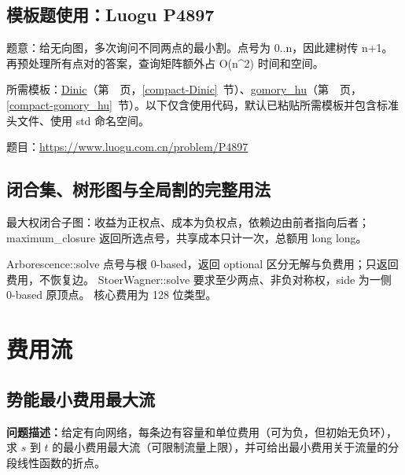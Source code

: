 

\Needspace{581pt}

\subsection*{模板题使用：Luogu P4897}

\label{usage-example-56}

题意：给无向图，多次询问不同两点的最小割。点号为 0..n，因此建树传 n+1。再预处理所有点对的答案，查询矩阵额外占 O(n\textasciicircum{}2) 时间和空间。

所需模板：\hyperref[compact-Dinic]{Dinic}（第~\pageref{compact-Dinic}~页，\ref{compact-Dinic}~节）、\hyperref[compact-gomory_hu]{gomory\_\allowbreak{}hu}（第~\pageref{compact-gomory_hu}~页，\ref{compact-gomory_hu}~节）。以下仅含使用代码，默认已粘贴所需模板并包含标准头文件、使用 std 命名空间。

题目：\url{https://www.luogu.com.cn/problem/P4897}



\subsection{闭合集、树形图与全局割的完整用法}\label{knowledge-closure-cuts}
最大权闭合子图：收益为正权点、成本为负权点，依赖边由前者指向后者；
maximum\_closure 返回所选点号，共享成本只计一次，总额用 long long。

Arborescence::solve 点号与根 0-based，返回 optional 区分无解与负费用；只返回费用，不恢复边。
StoerWagner::solve 要求至少两点、非负对称权，side 为一侧 0-based 原顶点。
核心费用为 128 位类型。


\newpage

\section{费用流}

\subsection{势能最小费用最大流}\label{compact-MinCostFlow}

\noindent\textbf{问题描述：}\allowbreak 给定有向网络，每条边有容量和单位费用（可为负，但初始无负环），求 $s$ 到 $t$ 的最小费用最大流（可限制流量上限），并可给出最小费用关于流量的分段线性函数的折点。


